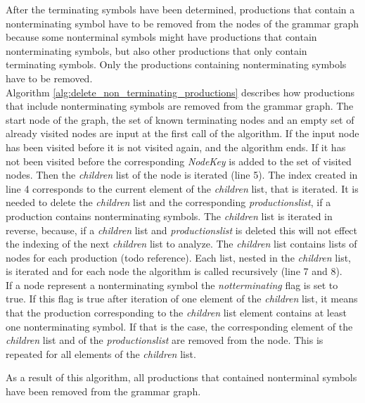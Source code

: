 After the terminating symbols have been determined, productions that contain a nonterminating symbol have to be removed from the nodes of the grammar graph because some nonterminal symbols might have productions that contain nonterminating symbols, but also other productions that only contain terminating symbols. Only the productions containing nonterminating symbols have to be removed.\\
Algorithm \ref{alg:delete_non_terminating_productions}  describes how productions that include nonterminating symbols are removed from the grammar graph.
The start node of the graph, the set of known terminating nodes and an empty set of already visited nodes are input at the first call of the algorithm.
If the input node has been visited before it is not visited again, and the algorithm ends. If it has not been visited before the corresponding \textit{Node\textunderscore Key} is added to the set of visited nodes.
Then the \textit{children} list of the node is iterated (line 5).
The index created in line 4 corresponds to the current element of the \textit{children} list, that is iterated. It is needed to delete the \textit{children} list and the corresponding \textit{productions\textunderscore list}, if a production contains nonterminating symbols. The \textit{children} list is iterated in reverse, because, if a \textit{children} list and \textit{productions\textunderscore list} is deleted this will not effect the indexing of the next \textit{children} list to analyze.
The \textit{children} list contains lists of nodes for each production (todo reference). Each list, nested in the \textit{children} list, is iterated and for each node the algorithm is called recursively (line 7 and 8).\\
If a node represent a nonterminating symbol the \textit{not\textunderscore terminating} flag is set to true.
If this flag is true after iteration of one element of the \textit{children} list, it means that the production corresponding to the \textit{children} list element contains at least one nonterminating symbol. If that is the case, the corresponding element of the \textit{children} list and of the \textit{productions\textunderscore list} are removed from the node.
This is repeated for all elements of the \textit{children} list.

As a result of this algorithm, all productions that contained nonterminal symbols have been removed from the grammar graph.

